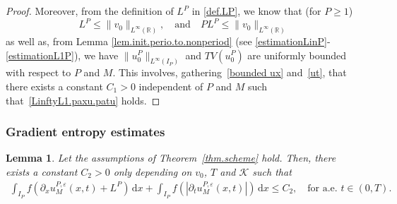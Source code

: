 \documentclass[11pt]{amsart}
\newtheorem{lemma}{Lemma}
\newcommand{\K}{\mathcal{K}}
\newcommand{\dd}{\mathrm{d}}
\newcommand{\pa}{\partial}
\newcommand{\R}{\mathbb{R}}
\newcommand{\eps}{\varepsilon}
\begin{document}
\begin{proof}
Moreover, from the definition of $L^P$ in 
\eqref{def.LP}, we know  that (for $P\ge 1$)
\begin{equation}\label{estimationLPPLP}L^P  \leq \|v_0\|_{L^\infty(\R)},  
\quad \mbox{and}\quad PL^P  \leq \|v_0\|_{L^\infty(\R)} \end{equation}
as well as, from Lemma \ref{lem.init.perio.to.nonperiod} (see \eqref{estimationLinP}-\eqref{estimationL1P}), we have 
$ \|u^P_0\|_{L^\infty(I_P)}$ and $TV(u^P_0)$ are uniformly bounded with respect to $P$ and $M$. 
This involves, gathering~\eqref{bounded ux} and~\eqref{ut}, that there exists  a constant
$C_1 >0$ independent of $P$ and $M$ such that~\eqref{LinftyL1.paxu.patu} holds.
\end{proof}

\subsubsection{Gradient entropy estimates}

\begin{lemma}\label{lem.fpartial}
Let the assumptions of Theorem~\ref{thm.scheme} hold. Then, there exists a constant $C_2>0$ only depending on  $v_0$, $T$ and $\K$ such that
\begin{align}
    \int_{I_P} f\left(\pa_x u^{P,\eps}_M(x,t)+L^P \right) \, \dd x + \int_{I_P} f\left(\left|\pa_t u^{P,\eps}_M(x,t)\right| \right) \, \dd x \leq C_2, \quad \mbox{for a.e. }t\in(0,T).
\end{align}
\end{lemma}
\end{document}
